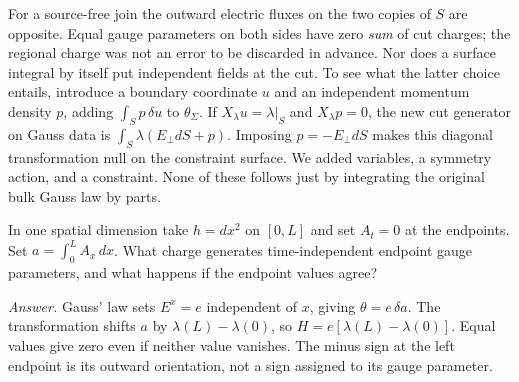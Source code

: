 For a source-free join the outward electric fluxes on the two copies of $S$
are opposite. Equal gauge parameters on both sides have zero \emph{sum} of
cut charges; the regional charge was not an error to be discarded in advance.
Nor does a surface integral by itself put independent fields at the cut. To
see what the latter choice entails, introduce a boundary coordinate $u$ and
an independent momentum density $p$, adding $\int_S p\,\delta u$ to
$\theta_\Sigma$. If $X_\lambda u=\lambda|_S$ and $X_\lambda p=0$, the new
cut generator on Gauss data is $\int_S\lambda(E_\perp dS+p)$. Imposing
$p=-E_\perp dS$ makes this diagonal transformation null on the constraint
surface. We added variables, a symmetry action, and a constraint. None of
these follows just by integrating the original bulk Gauss law by parts.

\begin{exercise}
In one spatial dimension take $h=dx^2$ on $[0,L]$ and set $A_t=0$ at the
endpoints. Set $a=\int_0^L A_x\,dx$. What charge generates time-independent
endpoint gauge parameters, and what happens if the endpoint values agree?
\end{exercise}
\noindent\emph{Answer.} Gauss' law sets $E^x=e$ independent of $x$, giving
$\theta=e\,\delta a$. The transformation shifts $a$ by
$\lambda(L)-\lambda(0)$, so $H=e[\lambda(L)-\lambda(0)]$. Equal values give
zero even if neither value vanishes. The minus sign at the left endpoint is
its outward orientation, not a sign assigned to its gauge parameter.

